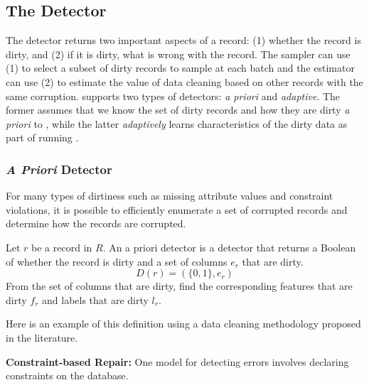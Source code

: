 \subsection{The Detector}\label{det}

The detector returns two important aspects of a record: 
(1) whether the record is dirty, and (2) if it is dirty, what is wrong with the record.
The sampler can use (1) to select a subset of dirty records to sample at each batch and 
the estimator can use (2) to estimate the value of data cleaning based on other records with the same corruption.
\sys supports two types of detectors: \emph{a priori} and \emph{adaptive}.
The former assumes that we know the set of dirty records and how they are dirty \emph{a priori} to \sys,
while the latter \emph{adaptively} learns characteristics of the dirty data as part of running \sys.

\subsubsection{\protect\textit{\large A Priori} Detector}
For many types of dirtiness such as missing attribute values and constraint violations, 
it is possible to efficiently enumerate a set of corrupted records and determine how the records are corrupted.

\begin{definition}
Let $r$ be a record in $R$. An a priori detector is a detector that returns a Boolean of whether the record is dirty and a set of columns $e_r$ that are dirty.
\[
D(r) = (\{0,1\}, e_r)
\]
From the set of columns that are dirty, find the corresponding features that are dirty $f_r$ and labels that are dirty $l_r$.
\end{definition}

\noindent Here is an example of this definition using a data cleaning methodology proposed in the literature.

\vspace{0.5em}

\noindent\textbf{Constraint-based Repair: }
One model for detecting errors involves declaring constraints on the database.

